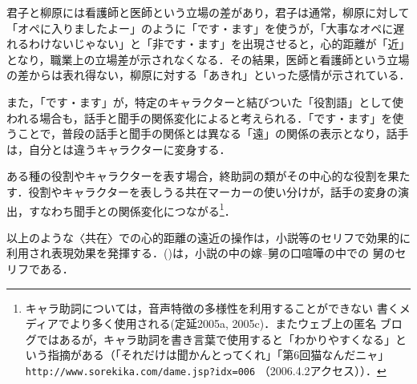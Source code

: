 \documentclass[japanese]{jnlp_1.3c}
\begin{document}
君子と柳原には看護師と医師という立場の差があり，君子は通常，柳原に対して
「オペに入りましたよー」のように「です・ます」を使うが，「大事なオペに遅
れるわけないじゃない」と「非です・ます」を出現させると，心的距離が「近」
となり，職業上の立場差が示されなくなる．その結果，医師と看護師という立場
の差からは表れ得ない，柳原に対する「あきれ」といった感情が示されている．

また，「です・ます」が，特定のキャラクターと結びついた「役割語」として使
われる場合も，話手と聞手の関係変化によると考えられる．「です・ます」を使
うことで，普段の話手と聞手の関係とは異なる「遠」の関係の表示となり，話手
は，自分とは違うキャラクターに変身する．


ある種の役割やキャラクターを表す場合，終助詞の類がその中心的な役割を果た
す．役割やキャラクターを表しうる共在マーカーの使い分けが，話手の変身の演
出，すなわち聞手との関係変化につながる\footnote{
	キャラ助詞については，音声特徴の多様性を利用することができない
	書くメディアでより多く使用される(定延2005a, 2005c)．またウェブ上の匿名
	ブログではあるが，キャラ助詞を書き言葉で使用すると「わかりやすくなる」と
	いう指摘がある（「それだけは聞かんとってくれ」「第6回猫なんだニャ」{\tt
	http://www.sorekika.com/dame.jsp?idx=006} （2006.4.2アクセス））．}．

以上のような〈共在〉での心的距離の遠近の操作は，小説等のセリフで効果的に
利用され表現効果を発揮する．()は，小説の中の嫁--舅の口喧嘩の中での
舅のセリフである．

\end{document}
